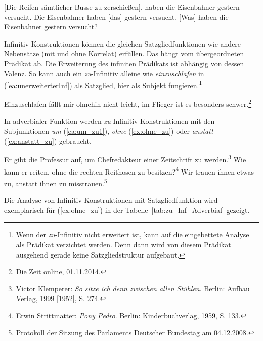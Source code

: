 \ea \label{ea:Inf_SG_Tests}
\ea \label{ea:Inf_Top} [Die Reifen sämtlicher Busse zu zerschießen], haben die Eisenbahner gestern versucht. 
\ex \label{ex:Inf_Prn} Die Eisenbahner haben [das] gestern versucht.
\ex \label{ex:Inf_Frage} [Was] haben die Eisenbahner gestern versucht?
\z 
\z 

Infinitiv-Konstruktionen können die gleichen  Satzgliedfunktionen wie andere Nebensätze (mit und ohne Korrelat) erfüllen. Das hängt vom übergeordneten Prädikat ab. Die Erweiterung des infiniten Prädikats ist abhängig von dessen Valenz. So kann auch ein \textit{zu}-Infinitiv alleine wie \textit{einzuschlafen} in (\ref{ea:unerweiterterInf}) als Satzglied, hier als Subjekt fungieren.\footnote{Wenn der \textit{zu}-Infinitiv nicht erweitert ist, kann auf die eingebettete Analyse als Prädikat verzichtet werden. Denn dann wird von diesem Prädikat ausgehend gerade keine Satzgliedstruktur aufgebaut.} 

\ea \label{ea:unerweiterterInf} Einzuschlafen fällt mir ohnehin nicht leicht, im Flieger ist es besonders schwer.\footnote{Die Zeit online, 01.11.2014.} 
\z 

In adverbialer Funktion werden \textit{zu}-Infinitiv-Konstruktionen mit den Subjunktionen \textit{um} (\ref{ea:um_zu1}), \textit{ohne} (\ref{ex:ohne_zu}) oder \textit{anstatt} (\ref{ex:anstatt_zu}) gebraucht. 

\ea \label{ea:Adv_Inf_zu}
\ea \label{ea:um_zu1} Er gibt die Professur auf, um Chefredakteur einer Zeitschrift zu werden.\footnote{Victor Klemperer: \textit{So sitze ich denn zwischen allen Stühlen}. Berlin: Aufbau Verlag, 1999 [1952], S. 274.} 
\ex \label{ex:ohne_zu} Wie kann er reiten, ohne die rechten Reithosen zu besitzen?\footnote{Erwin Strittmatter: \textit{Pony Pedro}. Berlin: Kinderbuchverlag, 1959, S. 133.} 
\ex \label{ex:anstatt_zu} Wir trauen ihnen etwas zu, anstatt ihnen zu misstrauen.\footnote{Protokoll der Sitzung des Parlaments Deutscher Bundestag am 04.12.2008.} 
\z 
\z 

Die Analyse von Infinitiv-Konstruktionen mit Satzgliedfunktion wird exemplarisch für (\ref{ex:ohne_zu}) in der Tabelle~\ref{tab:zu_Inf_Adverbial} gezeigt.

